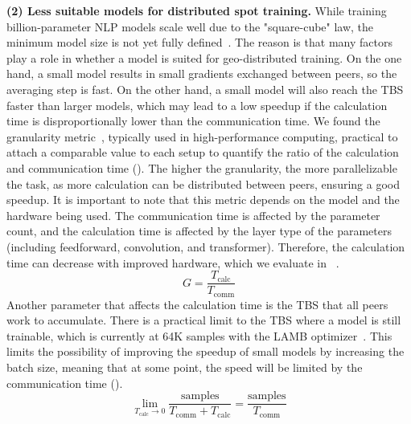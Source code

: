 \textbf{(2) Less suitable models for distributed spot training.} While training billion-parameter NLP models scale well due to the "square-cube" law, the minimum model size is not yet fully defined~\cite{ryabinin2023swarm}. 
The reason is that many factors play a role in whether a model is suited for geo-distributed training.
On the one hand, a small model results in small gradients exchanged between peers, so the averaging step is fast.
On the other hand, a small model will also reach the TBS faster than larger models, which may lead to a low speedup if the calculation time is disproportionally lower than the communication time.
We found the granularity metric~\cite{10.5555/541880}, typically used in high-performance computing, practical to attach a comparable value to each setup to quantify the ratio of the calculation and communication time ().
The higher the granularity, the more parallelizable the task, as more calculation can be distributed between peers, ensuring a good speedup.
It is important to note that this metric depends on the model and the hardware being used. 
The communication time is affected by the parameter count, and the calculation time is affected by the layer type of the parameters (including feedforward, convolution, and transformer).
Therefore, the calculation time can decrease with improved hardware, which we evaluate in ~.
\vspace*{-1mm}
\begin{equation}
    G = \frac{T_{\text{calc}}}{T_{\text{comm}}}
    \label{eq:granularity-formula}
\end{equation}
Another parameter that affects the calculation time is the TBS that all peers work to accumulate.
There is a practical limit to the TBS where a model is still trainable, which is currently at 64K samples with the LAMB optimizer~\cite{you2019large}.
This limits the possibility of improving the speedup of small models by increasing the batch size, meaning that at some point, the speed will be limited by the communication time ().
\vspace*{-4mm}
\begin{equation}
    \lim \limits_{T_{\text{calc}} \to 0} \frac{\text{samples}}{T_\text{comm} + T_\text{calc}} = \frac{\text{samples}}{T_\text{comm}}
    \label{eq:time-formula}
\end{equation}

